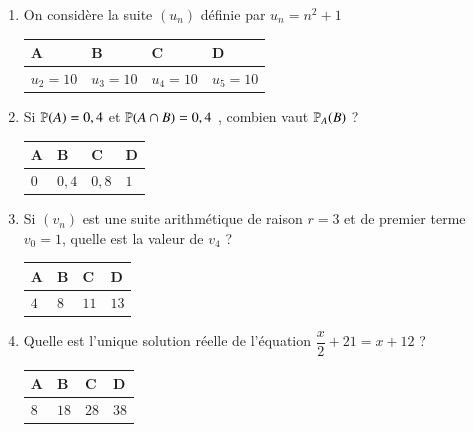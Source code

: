 \documentclass[oneside,12pt]{exam}          %
\begin{document}
\begin{enumerate}[label=\underline{Question \no\arabic*} :  , leftmargin=* , itemsep=5mm]
	\item On considère la suite $(u_n)$ définie par $u_n = n^2 + 1$
	
		\hspace{\linewidth-\textwidth}
		\renewcommand{\arraystretch}{1.5}
		\begin{tabular}{| P{0.22\textwidth} | P{0.22\textwidth} | P{0.22\textwidth} | P{0.22\textwidth} |} \hline
			A & B & C & D \\ \hline
			$u_2 = 10$ & $u_3 = 10$ & $u_4 = 10$ & $u_5=10$ \\ \hline
		\end{tabular}



	\item Si ${\mathbb P}(A) = 0,4$ et ${\mathbb P}(A \cap B) =  0,4$ , combien vaut ${\mathbb P}_A(B)$ ?
	
		\hspace{\linewidth-\textwidth}
		\renewcommand{\arraystretch}{1.5}
		\begin{tabular}{| P{0.22\textwidth} | P{0.22\textwidth} | P{0.22\textwidth} | P{0.22\textwidth} |} \hline
			A & B & C & D \\ \hline
			$0$ & $0,4$ & $0,8$ & $1$ \\ \hline
		\end{tabular}
		
		

	\item Si $(v_n)$ est une suite arithmétique de raison $r = 3$ et de premier terme $v_0 = 1$, quelle est la valeur de  $v_4$ ?
	
		\hspace{\linewidth-\textwidth}
		\renewcommand{\arraystretch}{1.5}
		\begin{tabular}{| P{0.22\textwidth} | P{0.22\textwidth} | P{0.22\textwidth} | P{0.22\textwidth} |} \hline
			A & B & C & D \\ \hline
			$4$ & $8$ & $11$ & $13$ \\ \hline
		\end{tabular}
		
		

	\item Quelle est l'unique solution réelle de l'équation $\dfrac{x}{2} + 21 = x + 12$ ?
	
		\hspace{\linewidth-\textwidth}
		\renewcommand{\arraystretch}{1.5}
		\begin{tabular}{| P{0.22\textwidth} | P{0.22\textwidth} | P{0.22\textwidth} | P{0.22\textwidth} |} \hline
			A & B & C & D \\ \hline
			$8$ & $18$ & $28$ & $38$ \\ \hline
		\end{tabular}
		

\end{enumerate}
\end{document}
